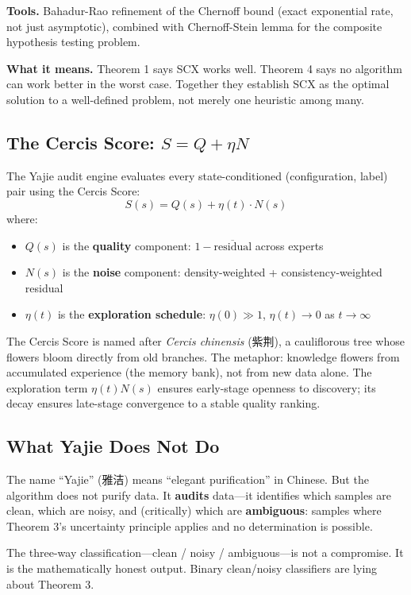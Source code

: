 \documentclass[12pt,a4paper]{ctexart}
\begin{document}
\textbf{Tools.} Bahadur-Rao refinement of the Chernoff bound (exact exponential rate, not just asymptotic), combined with Chernoff-Stein lemma for the composite hypothesis testing problem.

\textbf{What it means.} Theorem 1 says SCX works well. Theorem 4 says no algorithm can work better in the worst case. Together they establish SCX as the optimal solution to a well-defined problem, not merely one heuristic among many.

\subsection{The Cercis Score: $S = Q + \eta N$}

The Yajie audit engine evaluates every state-conditioned (configuration, label) pair using the Cercis Score:
\[
S(s) = Q(s) + \eta(t) \cdot N(s)
\]
where:
\begin{itemize}
\item $Q(s)$ is the \textbf{quality} component: $1 - \overline{\text{residual}}$ across experts
\item $N(s)$ is the \textbf{noise} component: density-weighted + consistency-weighted residual
\item $\eta(t)$ is the \textbf{exploration schedule}: $\eta(0) \gg 1$, $\eta(t) \to 0$ as $t \to \infty$
\end{itemize}

The Cercis Score is named after \textit{Cercis chinensis} (紫荆), a cauliflorous tree whose flowers bloom directly from old branches. The metaphor: knowledge flowers from accumulated experience (the memory bank), not from new data alone. The exploration term $\eta(t) N(s)$ ensures early-stage openness to discovery; its decay ensures late-stage convergence to a stable quality ranking.

\subsection{What Yajie Does Not Do}

The name ``Yajie'' (雅洁) means ``elegant purification'' in Chinese. But the algorithm does not purify data. It \textbf{audits} data—it identifies which samples are clean, which are noisy, and (critically) which are \textbf{ambiguous}: samples where Theorem 3's uncertainty principle applies and no determination is possible.

The three-way classification—clean / noisy / ambiguous—is not a compromise. It is the mathematically honest output. Binary clean/noisy classifiers are lying about Theorem 3.
\end{document}
